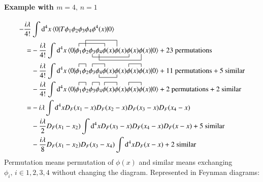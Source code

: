\paragraph{Example with $m=4 ,\, n=1$}
\begin{align*}
	-\frac{i\lambda}{4!} &\int \dd^4 x \braket{0 | T \phi_1 \phi_2 \phi_3 \phi_4 \phi^4(x) | 0} \\
	= &-\frac{i\lambda}{4!}  \int \dd^4 x \braket{0 |
		\acontraction{}{\phi_1}{\phi_2 \phi_3 \phi_4}{\phi}
		\acontraction[2ex]{\phi_1}{\phi_2}{\phi_3 \phi_4 \phi(x)}{\phi}
		\bcontraction[1ex]{\phi_1\phi_2}{\phi_3}{\phi_4 \phi(x) \phi(x)}{\phi}
		\bcontraction[2ex]{\phi_1 \phi_2 \phi_3}{\phi_4}{\phi(x) \phi(x) \phi(x)}{\phi}
		\phi_1 \phi_2 \phi_3 \phi_4 \phi(x) \phi(x) \phi(x) \phi(x) 
		| 0} + \text{23 permutations} \\
	& -\frac{i\lambda}{4!}  \int \dd^4 x  \braket{0 | 
		\acontraction{}{\phi_1}{}{\phi_2}
		\acontraction{\phi_1\phi_2}{\phi_3}{\phi_4}{\phi}
		\bcontraction{\phi_1 \phi_2 \phi_3}{\phi_4}{\phi(x)}{\phi}
		\acontraction{\phi_1 \phi_2 \phi_3 \phi_4 \phi(x)\phi(x)}{\phi}{(x)}{\phi}
		\phi_1 \phi_2 \phi_3 \phi_4 \phi(x)\phi(x)\phi(x)\phi(x) 
		| 0} + \text{11 permutations} + \text{5 similar} \\
	& -\frac{i\lambda}{4!}  \int \dd^4 x  \braket{0 | 
		\contraction{}{\phi_1}{}{\phi_2}\phi_1 \phi_2 \contraction{}{\phi_3}{}{\phi_4}\phi_3 \phi_4 \contraction{}{\phi}{(x)}{\phi}\phi(x)\phi(x)\contraction{}{\phi}{(x)}{\phi}\phi(x)\phi(x) 
	| 0} + \text{2 permutations} + \text{2 similar} \\
		=& -i\lambda \int \dd^4 x D_F(x_1 - x) D_F(x_2 - x) D_F(x_3 - x) D_F(x_4 - x) \\
	&- \frac{i\lambda}{2} D_F(x_1 - x_2) \int \dd^4 x D_F(x_3 - x) D_F(x_4 - x) D_F(x-x)+ \text{5 similar} \\
	& -\frac{i\lambda}{8} D_F(x_1 - x_2) D_F(x_3 - x_4) \int \dd^4 x D_F(x-x) + \text{2 similar}
\end{align*}
Permutation means permutation of $\phi(x)$ and similar means exchanging $\phi_i, \,i \in {1,2,3,4}$ without changing the diagram.
Represented in Feynman diagrams:

